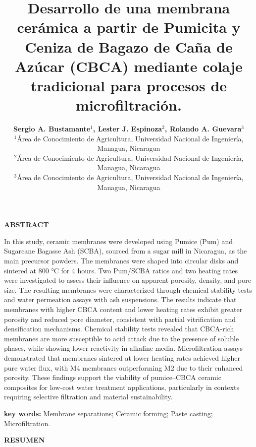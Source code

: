 \documentclass{article}
\title{\textbf{Desarrollo de una membrana cerámica a partir de Pumicita y Ceniza de Bagazo de Caña de Azúcar (CBCA) mediante colaje tradicional para procesos de microfiltración.}}
\author{\textbf{Sergio A. Bustamante$^1$, Lester J. Espinoza$^2$, Rolando A. Guevara$^3$}\\ $^1$Área de Conocimiento de Agricultura, Universidad Nacional de Ingeniería, Managua, Nicaragua\\ $^2$Área de Conocimiento de Agricultura, Universidad Nacional de Ingeniería, Managua, Nicaragua\\ $^3$Área de Conocimiento de Agricultura, Universidad Nacional de Ingeniería, Managua, Nicaragua}
\date{}
\begin{document}
\maketitle

\begin{center}
    \textbf{\large{ABSTRACT} }
\end{center}

\justifying
In this study, ceramic membranes were developed using Pumice (Pum) and Sugarcane Bagasse Ash (SCBA), sourced from a sugar mill in Nicaragua, as the main precursor powders. The membranes were shaped into circular disks and sintered at 800 °C for 4 hours. Two Pum/SCBA ratios and two heating rates were investigated to assess their influence on apparent porosity, density, and pore size. The resulting membranes were characterized through chemical stability tests and water permeation assays with ash suspensions. The results indicate that membranes with higher CBCA content and lower heating rates exhibit greater porosity and reduced pore diameter, consistent with partial vitrification and densification mechanisms. Chemical stability tests revealed that CBCA-rich membranes are more susceptible to acid attack due to the presence of soluble phases, while showing lower reactivity in alkaline media. Microfiltration assays demonstrated that membranes sintered at lower heating rates achieved higher pure water flux, with M4 membranes outperforming M2 due to their enhanced porosity. These findings support the viability of pumice–CBCA ceramic composites for low-cost water treatment applications, particularly in contexts requiring selective filtration and material sustainability.
\hfill \break

\textbf{key words:} Membrane separations; Ceramic forming; Paste casting; Microfiltration. 

\begin{center}
    \textbf{\large{RESUMEN} }
\end{center}
\end{document}
